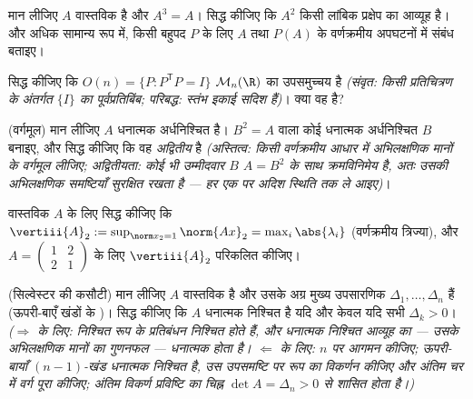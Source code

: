 \begin{exercise}[$\star\star$]\label{exo:b2:quadratic:4}
मान लीजिए $A$ वास्तविक  है और $A^3 = A$। सिद्ध कीजिए कि $A^2$ किसी लांबिक
प्रक्षेप का आव्यूह है। और अधिक सामान्य रूप में, किसी बहुपद $P$ के लिए $A$
तथा $P(A)$ के वर्णक्रमीय अपघटनों में संबंध बताइए।
\end{exercise}

\begin{exercise}[$\star\star$]\label{exo:b2:quadratic:5}
सिद्ध कीजिए कि $O(n) = \{P : P^{\mathsf T}P = I\}$ $\mathcal{M}_n(\R)$ का  उपसमुच्चय है \emph{(संवृत: किसी 
प्रतिचित्रण के अंतर्गत $\{I\}$ का पूर्वप्रतिबिंब; परिबद्ध: स्तंभ इकाई सदिश
हैं)}। क्या वह  है?
\end{exercise}

\begin{exercise}[$\star\star$]\label{exo:b2:quadratic:6}
(वर्गमूल) मान लीजिए $A$  धनात्मक अर्धनिश्चित है। $B^2 = A$ वाला कोई 
धनात्मक अर्धनिश्चित $B$ बनाइए, और सिद्ध कीजिए कि वह \emph{अद्वितीय} है
\emph{(अस्तित्व: किसी वर्णक्रमीय आधार में अभिलक्षणिक मानों के वर्गमूल
लीजिए; अद्वितीयता: कोई भी उम्मीदवार $B$ $A = B^2$ के साथ क्रमविनिमेय है, अतः
उसकी अभिलक्षणिक समष्टियाँ सुरक्षित रखता है --- हर एक पर अदिश स्थिति तक ले
आइए)}।
\end{exercise}

\begin{exercise}[$\star\star$]\label{exo:b2:quadratic:7}
वास्तविक  $A$ के लिए सिद्ध कीजिए कि $\vertiii{A}_2 :=
\sup_{\norm x_2 = 1}\norm{Ax}_2 = \max_i \abs{\lambda_i}$ (वर्णक्रमीय त्रिज्या), और
$A =
\begin{pmatrix} 1 & 2\\ 2 & 1\end{pmatrix}$ के लिए $\vertiii{A}_2$ परिकलित कीजिए।
\end{exercise}

\begin{exercise}[$\star\star\star$]\label{exo:b2:quadratic:8}
(सिल्वेस्टर की कसौटी) मान लीजिए $A$ वास्तविक  है और उसके अग्र मुख्य
उपसारणिक $\Delta_1, \dots, \Delta_n$ हैं (ऊपरी-बाएँ खंडों के )। सिद्ध कीजिए कि $A$ धनात्मक
निश्चित है यदि और केवल यदि सभी $\Delta_k > 0$। \emph{($\Rightarrow$ के लिए: निश्चित रूप के
प्रतिबंधन निश्चित होते हैं, और धनात्मक निश्चित आव्यूह का  ---
उसके अभिलक्षणिक मानों का गुणनफल --- धनात्मक होता है। $\Leftarrow$ के लिए: $n$ पर
आगमन कीजिए; ऊपरी-बायाँ $(n-1)$-खंड धनात्मक निश्चित है, उस उपसमष्टि पर रूप का
विकर्णन कीजिए और अंतिम चर में वर्ग पूरा कीजिए; अंतिम विकर्ण प्रविष्टि का
चिह्न $\det A = \Delta_n > 0$ से शासित होता है।)}
\end{exercise}


